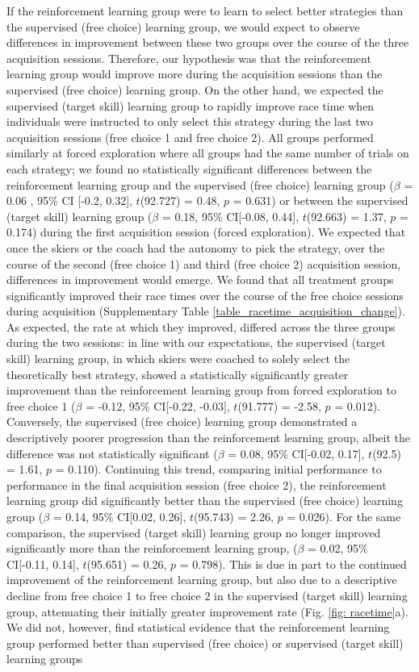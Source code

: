 \documentclass[pdflatex,sn-mathphys-num]{sn-jnl}%
\theoremstyle{thmstyleone}%
\theoremstyle{thmstyletwo}%
\theoremstyle{thmstylethree}%
\begin{document}
If the reinforcement learning group were to learn to select better strategies than the supervised (free choice) learning group, we would expect to observe differences in improvement between these two groups over the course of the three acquisition sessions. Therefore, our hypothesis was that the reinforcement learning group would improve more during the acquisition sessions than the supervised (free choice) learning group. On the other hand, we expected the supervised (target skill) learning group to rapidly improve race time when individuals were instructed to only select this strategy during the last two acquisition sessions (free choice 1 and free choice 2). All groups performed similarly at forced exploration where all groups had the same number of trials on each strategy; we found no statistically significant differences between the reinforcement learning group and the supervised (free choice) learning group ($\beta$ = 0.06 , 95\% CI [-0.2, 0.32], $t$(92.727) = 0.48, $p$ = 0.631) or between the supervised (target skill) learning group ($\beta$ = 0.18, 95\% CI[-0.08, 0.44], $t$(92.663) = 1.37, $p$ = 0.174) during the first acquisition session (forced exploration). We expected that once the skiers or the coach had the autonomy to pick the strategy, over the course of the second (free choice 1) and third (free choice 2) acquisition session, differences in improvement would emerge. We found that all treatment groups significantly improved their race times over the course of the free choice sessions during acquisition (Supplementary Table \ref{table_racetime_acquisition_change}). As expected, the rate at which they improved, differed across the three groups during the two sessions: in line with our expectations, the supervised (target skill) learning group, in which skiers were coached to solely select the theoretically best strategy, showed a statistically significantly greater improvement than the reinforcement learning group from forced exploration to free choice 1  ($\beta$ = -0.12, 95\% CI[-0.22, -0.03], $t$(91.777) = -2.58, $p$ = 0.012). Conversely, the supervised (free choice) learning group demonstrated a descriptively poorer progression than the reinforcement learning group, albeit the difference was not statistically significant ($\beta$ = 0.08, 95\% CI[-0.02, 0.17], $t$(92.5) = 1.61, $p$ = 0.110). Continuing this trend, comparing initial  performance to performance in the final acquisition session (free choice 2), the reinforcement learning group did significantly better than the supervised (free choice) learning group ($\beta$ = 0.14, 95\% CI[0.02, 0.26], $t$(95.743) = 2.26, $p$ = 0.026). For the same comparison, the supervised (target skill) learning group no longer improved significantly more than the reinforcement learning group, ($\beta$ = 0.02, 95\% CI[-0.11, 0.14], $t$(95.651) = 0.26, $p$ = 0.798). This is due in part to the continued improvement of the reinforcement learning group, but also due to a descriptive decline from free choice 1 to free choice 2 in the supervised (target skill) learning group, attenuating their initially greater improvement rate (Fig. \ref{fig: racetime}a). We did not, however, find statistical evidence that the reinforcement learning group performed better than supervised (free choice) or supervised (target skill) learning groups 
\end{document}
